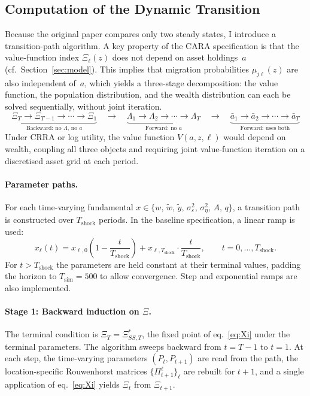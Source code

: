\documentclass[12pt, a4paper]{article}
\begin{document}
\subsection{Computation of the Dynamic Transition}
\label{sec:transition}

Because the original paper compares only two steady states, I introduce a transition-path algorithm. A key property of the CARA specification is that the value-function index $\Xi_\ell(z)$ does not depend on asset holdings~$a$ (cf.\ Section~\ref{sec:model}). This implies that migration probabilities $\mu_{j\ell}(z)$ are also independent of~$a$, which yields a three-stage decomposition: the value function, the population distribution, and the wealth distribution can each be solved sequentially, without joint iteration.
\begin{equation}
  \underbrace{\Xi_T \to \Xi_{T-1} \to \cdots \to \Xi_1}_{\text{Backward: no $\Lambda$, no $a$}}
  \quad\longrightarrow\quad
  \underbrace{\Lambda_1 \to \Lambda_2 \to \cdots \to \Lambda_T}_{\text{Forward: no $a$}}
  \quad\longrightarrow\quad
  \underbrace{\bar a_1 \to \bar a_2 \to \cdots \to \bar a_T}_{\text{Forward: uses both}}
  \label{eq:three_stage}
\end{equation}
Under CRRA or log utility, the value function $V(a,z,\ell)$ would depend on wealth, coupling all three objects and requiring joint value-function iteration on a discretised asset grid at each period.

\paragraph{Parameter paths.}
For each time-varying fundamental $x \in \{w,\, \tilde w,\, \tilde y,\, \sigma^2_\varepsilon,\, \sigma^2_\eta,\, A,\, q\}$, a transition path is constructed over $T_{\text{shock}}$ periods. In the baseline specification, a linear ramp is used:
\begin{equation}
  x_\ell(t) = x_{\ell,0}\!\left(1 - \frac{t}{T_{\text{shock}}}\right) + x_{\ell,T_{\text{shock}}} \cdot \frac{t}{T_{\text{shock}}}, \qquad t = 0,\ldots,T_{\text{shock}}.
  \label{eq:linear_path}
\end{equation}
For $t > T_{\text{shock}}$ the parameters are held constant at their terminal values, padding the horizon to $T_{\text{sim}} = 500$ to allow convergence. Step and exponential ramps are also implemented.

\paragraph{Stage 1: Backward induction on $\Xi$.}
The terminal condition is $\Xi_T = \Xi^*_{SS,T}$, the fixed point of eq.~\eqref{eq:Xi} under the terminal parameters. The algorithm sweeps backward from $t = T{-}1$ to $t = 1$. At each step, the time-varying parameters $(P_t, P_{t+1})$ are read from the path, the location-specific Rouwenhorst matrices $\{\Pi^\ell_{t+1}\}_\ell$ are rebuilt for $t{+}1$, and a single application of eq.~\eqref{eq:Xi} yields $\Xi_t$ from $\Xi_{t+1}$.
\end{document}
